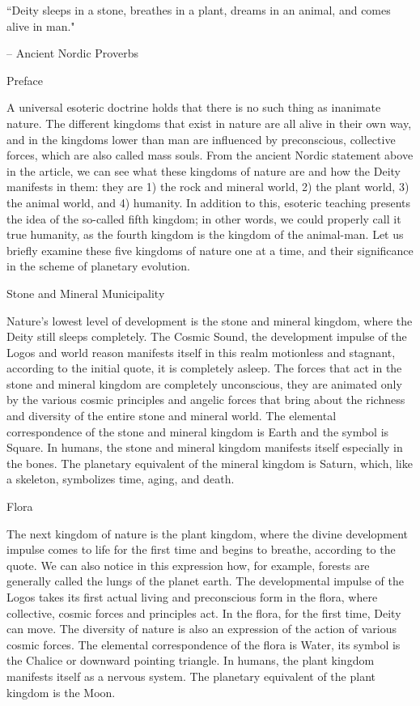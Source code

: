 \begin{footnotesize}
\begin{sffamily}
``Deity sleeps in a stone, breathes in a plant, dreams in an animal, and comes alive in man."

– Ancient Nordic Proverbs

Preface

A universal esoteric doctrine holds that there is no such thing as inanimate nature. The different kingdoms that exist in nature are all alive in their own way, and in the kingdoms lower than man are influenced by preconscious, collective forces, which are also called mass souls. From the ancient Nordic statement above in the article, we can see what these kingdoms of nature are and how the Deity manifests in them: they are 1) the rock and mineral world, 2) the plant world, 3) the animal world, and 4) humanity. In addition to this, esoteric teaching presents the idea of \hspace{0pt}\hspace{0pt}the so-called fifth kingdom; in other words, we could properly call it true humanity, as the fourth kingdom is the kingdom of the animal-man. Let us briefly examine these five kingdoms of nature one at a time, and their significance in the scheme of planetary evolution.

Stone and Mineral Municipality

Nature's lowest level of development is the stone and mineral kingdom, where the Deity still sleeps completely. The Cosmic Sound, the development impulse of the Logos and world reason manifests itself in this realm motionless and stagnant, according to the initial quote, it is completely asleep. The forces that act in the stone and mineral kingdom are completely unconscious, they are animated only by the various cosmic principles and angelic forces that bring about the richness and diversity of the entire stone and mineral world. The elemental correspondence of the stone and mineral kingdom is Earth and the symbol is Square. In humans, the stone and mineral kingdom manifests itself especially in the bones. The planetary equivalent of the mineral kingdom is Saturn, which, like a skeleton, symbolizes time, aging, and death.

Flora

The next kingdom of nature is the plant kingdom, where the divine development impulse comes to life for the first time and begins to breathe, according to the quote. We can also notice in this expression how, for example, forests are generally called the lungs of the planet earth. The developmental impulse of the Logos takes its first actual living and preconscious form in the flora, where collective, cosmic forces and principles act. In the flora, for the first time, Deity can move. The diversity of nature is also an expression of the action of various cosmic forces. The elemental correspondence of the flora is Water, its symbol is the Chalice or downward pointing triangle. In humans, the plant kingdom manifests itself as a nervous system. The planetary equivalent of the plant kingdom is the Moon.


\end{sffamily}
\end{footnotesize}
